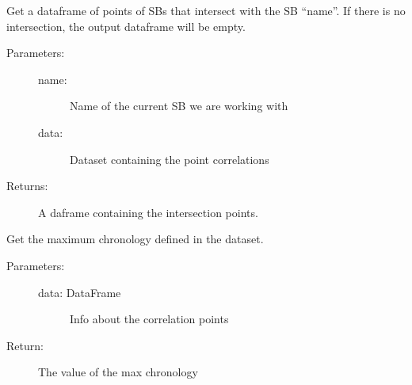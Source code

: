 \documentclass[letterpaper,10pt,english]{sphinxmanual}
\begin{document}
\begin{fulllineitems}
\label{\detokenize{hiegeo:hiegeo.get_intersect}}
Get a dataframe of points of SBs that intersect with the SB “name”.
If there is no intersection, the output dataframe will be empty.
\begin{description}
\item[{Parameters:}] \leavevmode\begin{description}
\item[{name: }] \leavevmode
Name of the current SB we are working with

\item[{data:}] \leavevmode
Dataset containing the point correlations

\end{description}

\item[{Returns:}] \leavevmode
A daframe containing the intersection points.

\end{description}

\end{fulllineitems}


\begin{fulllineitems}
\label{\detokenize{hiegeo:hiegeo.get_max_chronology}}
Get the maximum chronology defined in the dataset.
\begin{description}
\item[{Parameters:}] \leavevmode\begin{description}
\item[{data: DataFrame}] \leavevmode
Info about the correlation points

\end{description}

\item[{Return:}] \leavevmode
The value of the max chronology

\end{description}

\end{fulllineitems}

\end{document}
